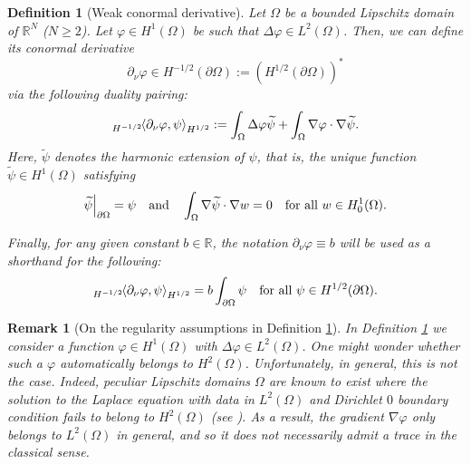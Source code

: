 \documentclass[a4paper,11pt]{article}
\newcommand\restr[2]{{%
\left.\kern-\nulldelimiterspace %
#1 %
\vphantom{|} %
\right|_{#2} %
}}
\newtheorem{remark}[theorem]{Remark}
\newtheorem{definition}[theorem]{Definition}
\newcommand{\pairing}[2]{
{}_{{H^{-1/2}}}\hspace*{-1mm}\left\langle #1, #2\right\rangle_{H^{1/2}}
}  %
\numberwithin{equation}{section}
\begin{document}
\begin{definition}[Weak conormal derivative]\label{def conormal}
Let $\Omega$ be a bounded Lipschitz domain of $\mathbb{R}^N$ ($N\ge 2$). Let $\varphi\in H^1(\Omega)$ be such that $\Delta \varphi\in L^2(\Omega)$. Then, we can define its conormal derivative 
\begin{equation*}
   \partial_\nu \varphi\in H^{-1/2}(\partial\Omega):=\left(H^{1/2}(\partial\Omega) \right)^* 
\end{equation*}
via the following duality pairing:
\begin{equation}\label{pa_nu via pairing}
\pairing{\partial_\nu\varphi}{\psi}:= \int_\Omega \Delta\varphi \widetilde\psi + \int_\Omega \nabla \varphi\cdot\nabla \widetilde\psi.
\end{equation}
Here, $\widetilde\psi$ denotes the harmonic extension of $\psi$, that is, the unique function $\widetilde\psi\in H^1(\Omega)$ satisfying 
\begin{equation}\label{weak harm extension definition}
  \restr{\widetilde\psi}{\partial\Omega}=\psi \quad \text{and} \quad \int_\Omega \nabla\widetilde\psi \cdot \nabla w =0 \quad \text{for all }w\in H_0^1(\Omega). 
\end{equation}

Finally, for any given constant $b\in\mathbb{R}$, the notation $\partial_\nu \varphi\equiv b$ will be used as a shorthand for the following:
\begin{equation*}
    \pairing{\partial_\nu \varphi}{\psi} = b\int_{\partial\Omega} \psi \quad \text{for all }\psi\in H^{1/2}(\partial\Omega).
\end{equation*}
\end{definition}

\begin{remark}[On the regularity assumptions in Definition \ref{def conormal}]
In Definition \ref{def conormal} we consider a function $\varphi\in H^1(\Omega)$ with $\Delta\varphi\in L^2(\Omega)$. One might wonder whether such a $\varphi$ automatically belongs to $H^2(\Omega)$.
Unfortunately, in general, this is not the case. Indeed, peculiar Lipschitz domains $\Omega$ are known to exist where the solution to the Laplace equation with data in $L^2(\Omega)$ and Dirichlet $0$ boundary condition fails to belong to $H^2(\Omega)$ (see \cite[Theorem~A, 2]{jerison_kenig1995inhomogeneous}). As a result, the gradient $\nabla\varphi$ only belongs to $L^2(\Omega)$ in general, and so it does not necessarily admit a trace in the classical sense.
\end{remark}
\end{document}
